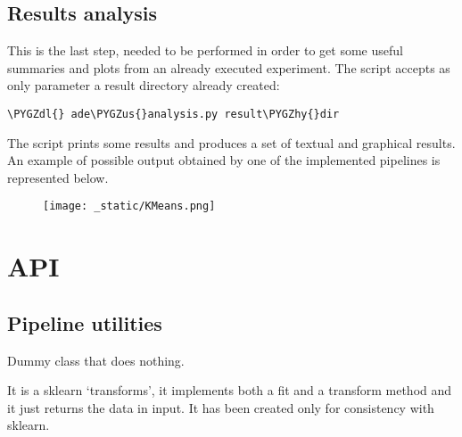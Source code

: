 \documentclass[letterpaper,10pt,english]{sphinxmanual}
\def\PYGZus{\char`\_}
\def\PYGZdl{\char`\$}
\def\PYGZhy{\char`\-}
\begin{document}
\subsection{Results analysis}
\label{tutorial:results-analysis}\label{tutorial:analysis}
This is the last step, needed to be performed in order to get some useful
summaries and plots from an already executed experiment.
The  script accepts as only parameter a result directory
already created:

\begin{Verbatim}[commandchars=\\\{\}]
\PYGZdl{} ade\PYGZus{}analysis.py result\PYGZhy{}dir
\end{Verbatim}

The script prints some results and produces a set of textual and graphical
results. An example of possible output obtained by one of the implemented pipelines is represented below.
\begin{figure}[htbp]
\centering

\texttt{[image: \_static/KMeans.png]}
\end{figure}


\section{API}
\label{index:api}\label{index:id1}

\subsection{Pipeline utilities}
\label{index:module-adenine.core.define_pipeline}\label{index:pipeline-utilities}

\begin{fulllineitems}
\label{index:adenine.core.define_pipeline.DummyNone}
Dummy class that does nothing.

It is a sklearn `transforms', it implements both a fit and a transform method and it just returns the data in input. It has been created only for consistency with sklearn.

\end{fulllineitems}

\end{document}
